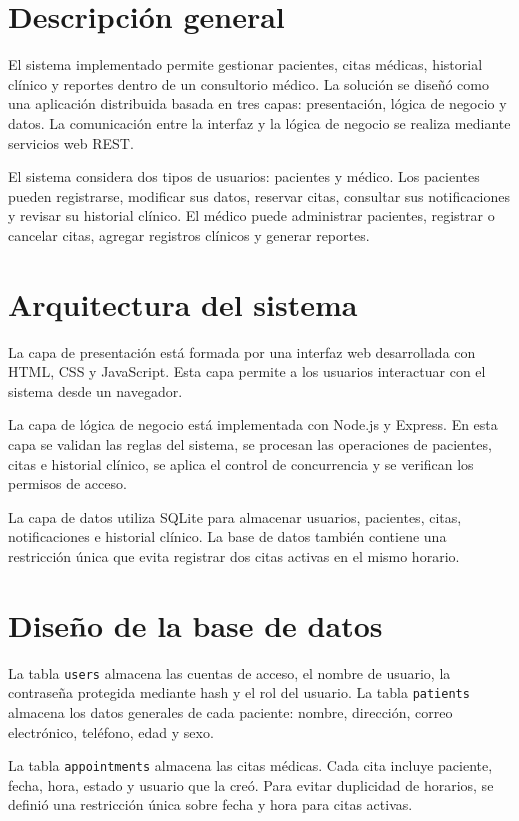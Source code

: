 \documentclass[12pt]{article}
\begin{document}
\section{Descripción general}

El sistema implementado permite gestionar pacientes, citas médicas, historial clínico y reportes dentro de un consultorio médico. La solución se diseñó como una aplicación distribuida basada en tres capas: presentación, lógica de negocio y datos. La comunicación entre la interfaz y la lógica de negocio se realiza mediante servicios web REST.

El sistema considera dos tipos de usuarios: pacientes y médico. Los pacientes pueden registrarse, modificar sus datos, reservar citas, consultar sus notificaciones y revisar su historial clínico. El médico puede administrar pacientes, registrar o cancelar citas, agregar registros clínicos y generar reportes.

\section{Arquitectura del sistema}

La capa de presentación está formada por una interfaz web desarrollada con HTML, CSS y JavaScript. Esta capa permite a los usuarios interactuar con el sistema desde un navegador.

La capa de lógica de negocio está implementada con Node.js y Express. En esta capa se validan las reglas del sistema, se procesan las operaciones de pacientes, citas e historial clínico, se aplica el control de concurrencia y se verifican los permisos de acceso.

La capa de datos utiliza SQLite para almacenar usuarios, pacientes, citas, notificaciones e historial clínico. La base de datos también contiene una restricción única que evita registrar dos citas activas en el mismo horario.

\section{Diseño de la base de datos}

La tabla \texttt{users} almacena las cuentas de acceso, el nombre de usuario, la contraseña protegida mediante hash y el rol del usuario. La tabla \texttt{patients} almacena los datos generales de cada paciente: nombre, dirección, correo electrónico, teléfono, edad y sexo.

La tabla \texttt{appointments} almacena las citas médicas. Cada cita incluye paciente, fecha, hora, estado y usuario que la creó. Para evitar duplicidad de horarios, se definió una restricción única sobre fecha y hora para citas activas.
\end{document}
